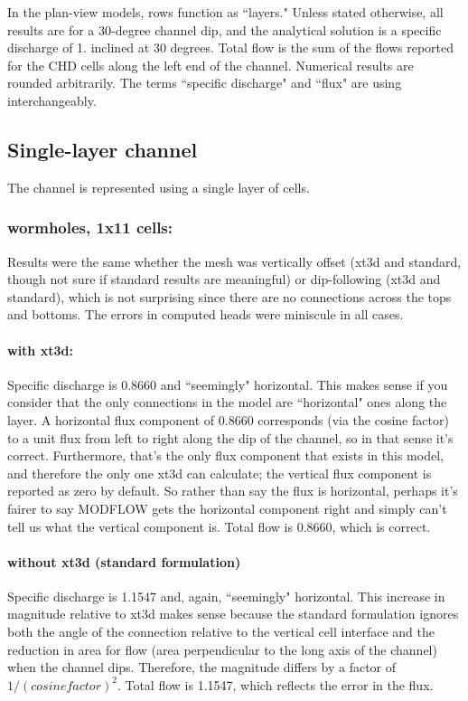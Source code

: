 \documentclass{article}
\begin{document}
In the plan-view models, rows function as ``layers." Unless stated otherwise, all results are for a 30-degree channel dip, and the analytical solution is a specific discharge of 1. inclined at 30 degrees. Total flow is the sum of the flows reported for the CHD cells along the left end of the channel. Numerical results are rounded arbitrarily. The terms ``specific discharge" and ``flux" are using interchangeably.

\subsection{Single-layer channel}
The channel is represented using a single layer of cells.

\subsubsection{wormholes, 1x11 cells:}
Results were the same whether the mesh was vertically offset (xt3d and standard, though not sure if standard results are meaningful) or dip-following (xt3d and standard), which is not surprising since there are no connections across the tops and bottoms. The errors in computed heads were miniscule in all cases.

\paragraph{with xt3d:} Specific discharge is 0.8660 and ``seemingly" horizontal. This makes sense if you consider that the only connections in the model are ``horizontal" ones along the layer. A horizontal flux component of 0.8660 corresponds (via the cosine factor) to a unit flux from left to right along the dip of the channel, so in that sense it's correct. Furthermore, that's the only flux component that exists in this model, and therefore the only one xt3d can calculate; the vertical flux component is reported as zero by default. So rather than say the flux is horizontal, perhaps it's fairer to say MODFLOW gets the horizontal component right and simply can't tell us what the vertical component is. Total flow is 0.8660, which is correct.

\paragraph{without xt3d (standard formulation)} Specific discharge is 1.1547 and, again, ``seemingly" horizontal. This increase in magnitude relative to xt3d makes sense because the standard formulation ignores both the angle of the connection relative to the vertical cell interface and the reduction in area for flow (area perpendicular to the long axis of the channel) when the channel dips. Therefore, the  magnitude differs by a factor of $1/{(cosine factor)}^2$. Total flow is 1.1547, which reflects the error in the flux.
\end{document}
